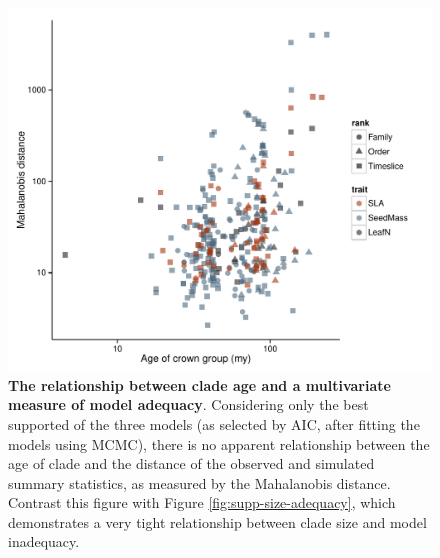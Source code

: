 \documentclass[a4paper,12pt]{article}
\begin{document}
\begin{figure}[p]
  \centering
  \includegraphics[scale=0.9]{figs/ad-age-bayes}
  \caption{\textbf{The relationship between clade age and a multivariate measure of model adequacy}. Considering only the best supported of the three models (as selected by AIC, after fitting the models using MCMC), there is no  apparent relationship between the age of clade and the distance of the observed and simulated summary statistics, as measured by the Mahalanobis distance. Contrast this figure with Figure \ref{fig:supp-size-adequacy}, which demonstrates a very tight relationship between clade size and model inadequacy.}
  \label{fig:supp-age-bayes}
\end{figure}
\end{document}
